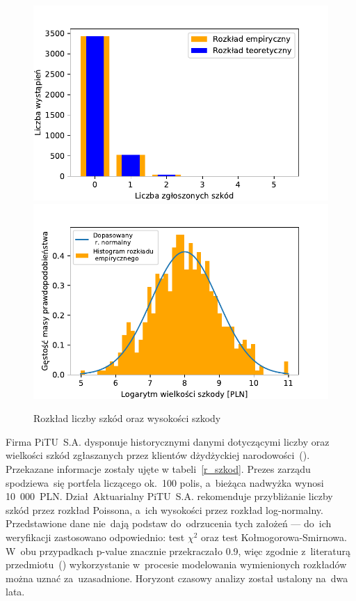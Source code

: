 \documentclass[12pt, a4paper, oneside]{mwart} %
\begin{document}
\begin{figure}
\centering
\caption{Rozkład liczby szkód oraz wysokości szkody}
\label{rozklad_szkod}
\includegraphics[width = \textwidth]{wykresy/rozklad_l_szkod.pdf}
\newline
\includegraphics[width = \textwidth]{wykresy/rozklad_wys_szkody.pdf}
\end{figure}

Firma PiTU~S.A. dysponuje historycznymi danymi dotyczącymi liczby oraz wielkości szkód zgłaszanych przez klientów dżydżyckiej narodowości~(\cite{case}). Przekazane informacje zostały ujęte w tabeli~\ref{r_szkod}. Prezes zarządu spodziewa~się portfela liczącego ok.~100 polis, a~bieżąca nadwyżka wynosi 10~000~PLN. Dział~Aktuarialny PiTU~S.A. rekomenduje przybliżanie liczby szkód przez rozkład Poissona, a~ich wysokości przez rozkład log-normalny. Przedstawione dane nie~dają podstaw do~odrzucenia tych założeń --- do~ich weryfikacji zastosowano odpowiednio: test $\chi^2$ oraz test Kołmogorowa-Smirnowa. W~obu przypadkach p-value znacznie przekraczało 0.9, więc zgodnie z~literaturą przedmiotu~(\cite{mielczarek}) wykorzystanie w~procesie modelowania wymienionych rozkładów można uznać za~uzasadnione. Horyzont czasowy analizy został ustalony na~dwa lata.
\end{document}
